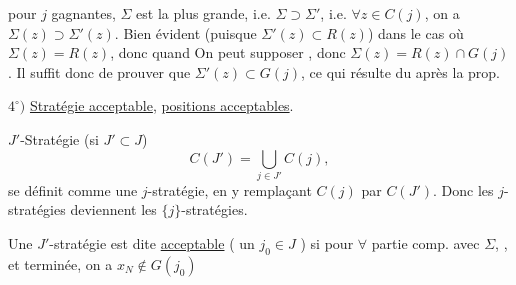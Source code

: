pour $j$ \inserted{$\Gamma$-}gagnantes,  $\Sigma$ est la plus grande, i.e. $\Sigma\supset\Sigma'$, i.e. $\forall z\in C(j)$, on a $\Sigma(z)\supset\Sigma'(z)$. Bien évident (puisque $\Sigma'(z)\subset R(z)$)  dans le cas où $\Sigma(z)=R(z)$, donc quand   On peut supposer , donc $\Sigma(z)=R(z)\cap G(j)$. Il suffit donc de prouver que $\Sigma'(z)\subset G(j)$,  ce qui résulte du  après la prop.


$4^\circ)$ \uline{Stratégie acceptable}, \uline{positions acceptables}.

$J'$-Stratégie (si $J'\subset J$)  
\[
C(J')=\bigcup_{j\in J'}C(j),
\]
se définit comme une $j$-stratégie, en y remplaçant $C(j)$ par $C(J')$.
Donc les $j$-stratégies deviennent les $\{j\}$-stratégies.

Une  $J'$-stratégie  est dite \uline{acceptable} ( un $j_0\in J$ ) si pour $\forall$ partie  comp. avec $\Sigma$, , et terminée, on a $x_N\notin G(j_0)$
